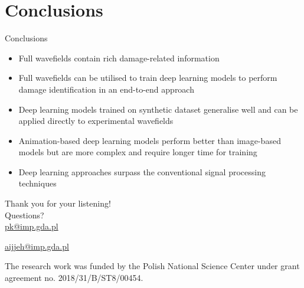 \documentclass[10pt,aspectratio=169,dvipsnames]{beamer} %
\begin{document}
\section{Conclusions}
\begin{frame}{Conclusions}
	\begin{itemize}
		\item Full wavefields contain rich damage-related information
		\item Full wavefields can be utilised to train deep learning models to perform damage identification in an end-to-end approach
		\item Deep learning models trained on synthetic dataset generalise well and can be applied directly to experimental wavefields
		\item Animation-based deep learning models perform better than image-based models but are more complex and require longer time for training
		\item Deep learning approaches surpass the conventional signal processing techniques
	\end{itemize}
\end{frame}
{
\begin{frame}[standout]
	Thank you for your listening!\\ \vspace{12pt}
	Questions?\\ \vspace{12pt}
	\url{pk@imp.gda.pl} 
	\par\medskip
	\url{aijjeh@imp.gda.pl}
	
 
\par\medskip
\par\medskip
\footnotesize
The research work was funded by the Polish National Science Center under grant agreement no. 2018/31/B/ST8/00454.
\end{frame}
}
\end{document}

